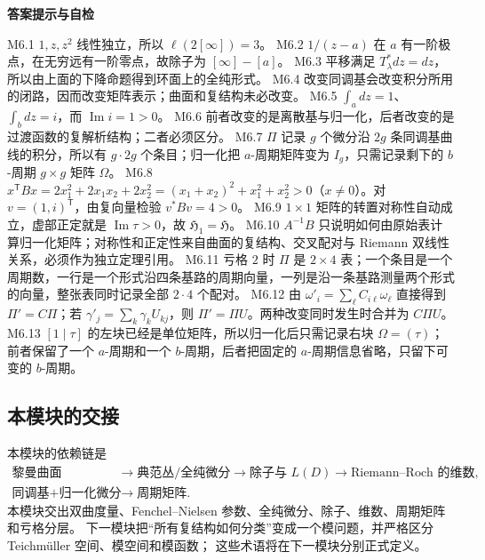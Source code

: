 \documentclass[UTF8,fontset=none,a4paper,11pt]{ctexart}
\theoremstyle{foundation-definition}
\theoremstyle{foundation-theorem}
\theoremstyle{foundation-proposition}
\theoremstyle{foundation-example}
\theoremstyle{foundation-remark}
\theoremstyle{foundation-theorem}
\newenvironment{answerkey}{%
\begin{mdframed}[backgroundcolor=examplebg,linecolor=examplepurple,linewidth=1.0pt,
  leftline=true,rightline=false,topline=false,bottomline=false,
  skipabove=7pt,skipbelow=8pt,innerleftmargin=10pt,innerrightmargin=8pt,
  innertopmargin=6pt,innerbottommargin=6pt]
{\sffamily\bfseries\color{examplepurple}答案提示与自检}\par\smallskip\small
}{\end{mdframed}}
\begin{document}
\begin{answerkey}
M6.1 \(1,z,z^2\) 线性独立，所以 \(\ell(2[\infty])=3\)。
M6.2 \(1/(z-a)\) 在 \(a\) 有一阶极点，在无穷远有一阶零点，故除子为 \([\infty]-[a]\)。
M6.3 平移满足 \(T_\lambda^*dz=dz\)，所以由上面的下降命题得到环面上的全纯形式。
M6.4 改变同调基会改变积分所用的闭路，因而改变矩阵表示；曲面和复结构未必改变。
M6.5 \(\int_a dz=1\)、\(\int_b dz=i\)，而 \(\operatorname{Im}i=1>0\)。
M6.6 前者改变的是离散基与归一化，后者改变的是过渡函数的复解析结构；二者必须区分。
M6.7 \(\Pi\) 记录 \(g\) 个微分沿 \(2g\) 条同调基曲线的积分，所以有 \(g\cdot2g\) 个条目；归一化把 \(a\)-周期矩阵变为 \(I_g\)，只需记录剩下的 \(b\)-周期 \(g\times g\) 矩阵 \(\Omega\)。
M6.8 \(x^{\mathsf T}Bx=2x_1^2+2x_1x_2+2x_2^2=(x_1+x_2)^2+x_1^2+x_2^2>0\)（\(x\neq0\)）。对 \(v=(1,i)^{\mathsf T}\)，由复向量检验 \(v^*Bv=4>0\)。
M6.9 \(1\times1\) 矩阵的转置对称性自动成立，虚部正定就是 \(\operatorname{Im}\tau>0\)，故 \(\mathfrak H_1=\mathfrak H\)。
M6.10 \(A^{-1}B\) 只说明如何由原始表计算归一化矩阵；对称性和正定性来自曲面的复结构、交叉配对与 Riemann 双线性关系，必须作为独立定理引用。
M6.11 亏格 \(2\) 时 \(\Pi\) 是 \(2\times4\) 表；一个条目是一个周期数，一行是一个形式沿四条基路的周期向量，一列是沿一条基路测量两个形式的向量，整张表同时记录全部 \(2\cdot4\) 个配对。
M6.12 由 \(\omega'_i=\sum_\ell C_{i\ell}\omega_\ell\) 直接得到 \(\Pi'=C\Pi\)；若 \(\gamma'_j=\sum_k\gamma_kU_{kj}\)，则 \(\Pi'=\Pi U\)。两种改变同时发生时合并为 \(C\Pi U\)。
M6.13 \([1\mid\tau]\) 的左块已经是单位矩阵，所以归一化后只需记录右块 \(\Omega=(\tau)\)；前者保留了一个 \(a\)-周期和一个 \(b\)-周期，后者把固定的 \(a\)-周期信息省略，只留下可变的 \(b\)-周期。
\end{answerkey}

\subsection{本模块的交接}

本模块的依赖链是
\[
\begin{aligned}
\text{黎曼曲面}
&\longrightarrow
\text{典范丛/全纯微分}
\longrightarrow
\text{除子与 }L(D)
\longrightarrow
\text{Riemann--Roch 的维数},\\
\text{同调基}+\text{归一化微分}
&\longrightarrow
\text{周期矩阵}.
\end{aligned}
\]
本模块交出双曲度量、Fenchel--Nielsen 参数、全纯微分、除子、维数、周期矩阵和亏格分层。
下一模块把“所有复结构如何分类”变成一个模问题，并严格区分 Teichmüller 空间、模空间和模函数；
这些术语将在下一模块分别正式定义。

\clearpage
\end{document}
